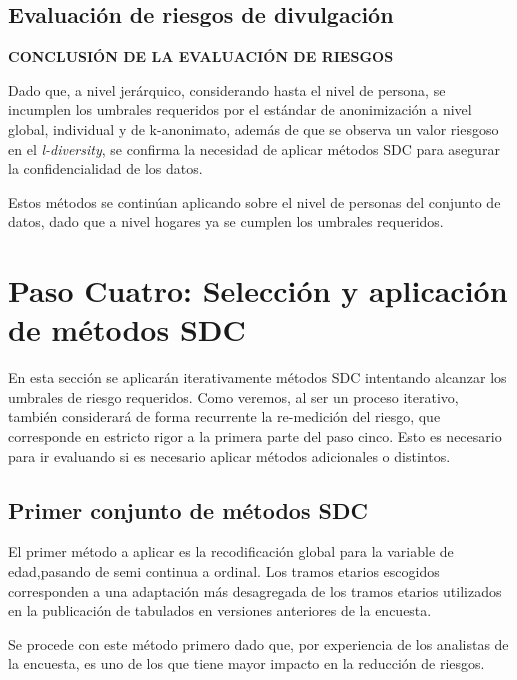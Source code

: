 \documentclass[
]{book}
\theoremstyle{definition}
\theoremstyle{definition}
\theoremstyle{definition}
\theoremstyle{definition}
\theoremstyle{remark}
\begin{document}
\hypertarget{evaluaciuxf3n-de-riesgos-de-divulgaciuxf3n}{%
\subsection{Evaluación de riesgos de divulgación}\label{evaluaciuxf3n-de-riesgos-de-divulgaciuxf3n}}

\textbf{CONCLUSIÓN DE LA EVALUACIÓN DE RIESGOS}

Dado que, a nivel jerárquico, considerando hasta el nivel de persona, se incumplen los umbrales requeridos por el estándar de anonimización a nivel global, individual y de k-anonimato, además de que se observa un valor riesgoso en el \emph{l-diversity}, se confirma la necesidad de aplicar métodos SDC para asegurar la confidencialidad de los datos.

Estos métodos se continúan aplicando sobre el nivel de personas del conjunto de datos, dado que a nivel hogares ya se cumplen los umbrales requeridos.

\hypertarget{paso-cuatro-selecciuxf3n-y-aplicaciuxf3n-de-muxe9todos-sdc}{%
\section{Paso Cuatro: Selección y aplicación de métodos SDC}\label{paso-cuatro-selecciuxf3n-y-aplicaciuxf3n-de-muxe9todos-sdc}}

En esta sección se aplicarán iterativamente métodos SDC intentando alcanzar los umbrales de riesgo requeridos. Como veremos, al ser un proceso iterativo, también considerará de forma recurrente la re-medición del riesgo, que corresponde en estricto rigor a la primera parte del paso cinco. Esto es necesario para ir evaluando si es necesario aplicar métodos adicionales o distintos.

\hypertarget{primer-conjunto-de-muxe9todos-sdc}{%
\subsection{Primer conjunto de métodos SDC}\label{primer-conjunto-de-muxe9todos-sdc}}

El primer método a aplicar es la recodificación global para la variable de edad,pasando de semi continua a ordinal. Los tramos etarios escogidos corresponden a una adaptación más desagregada de los tramos etarios utilizados en la publicación de tabulados en versiones anteriores de la encuesta.

Se procede con este método primero dado que, por experiencia de los analistas de la encuesta, es uno de los que tiene mayor impacto en la reducción de riesgos.
\end{document}
